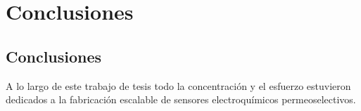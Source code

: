  \newcommand{\NoBiblioConc}[1]{
 \ifthenelse{\equal{#1}{verdadero}}{}{}
 \NoBiblioConc{verdadero}}

 	
 \FormatoCapituloUnaLinea
 
 \chapter{Conclusiones}
 \label{chap:Conclusiones}

 \thispagestyle{empty}
	


 \vfill
 \minitoc
 \newpage

\section*{Conclusiones}

A lo largo de este trabajo de tesis todo la concentración y el esfuerzo estuvieron dedicados a la fabricación escalable de sensores electroquímicos permeoselectivos. 

